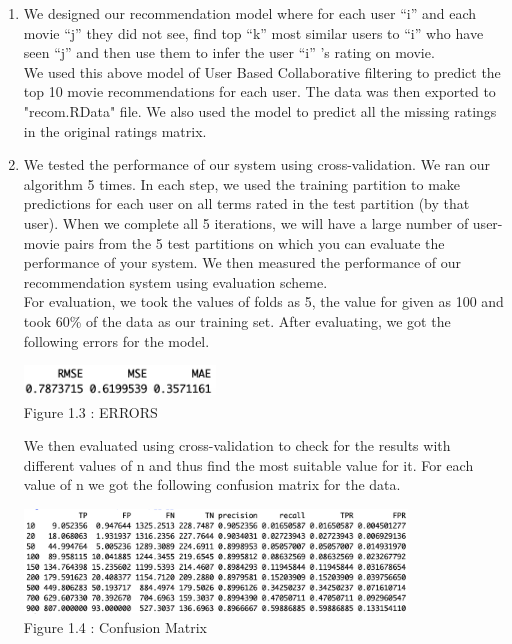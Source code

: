 \documentclass[11pt]{article}
\begin{document}
\begin{enumerate}
\begin{enumerate}
    \item We designed our recommendation model where for each user “i” and each movie “j” they did not see, find top “k” most similar users to “i” who have seen “j” and then use them to infer the user “i” ’s rating on movie.
    \\We used this above model of User Based Collaborative filtering to predict the top 10 movie recommendations for each user. The data was then exported to "recom.RData" file. We also used the model to predict all the missing ratings in the original ratings matrix.
    \item We tested the performance of our system using cross-validation. We ran our algorithm 5 times. In each step, we used the training partition to make predictions for each user on all terms rated in the test partition (by that user). When we complete all 5 iterations, we will have a large number of user-movie pairs from the 5 test partitions on which you can evaluate the performance of your system. We then measured the performance of our recommendation system using evaluation scheme.
    \\For evaluation, we took the values of folds as 5, the value for given as 100 and took 60\% of the data as our training set. After evaluating, we got the following errors for the model.
    \begin{center}
    \includegraphics[width=0.4\textwidth]{dff.png}
    \\\footnotesize Figure 1.3 : ERRORS 
\end{center}
We then evaluated using cross-validation to check for the results with different values of n and thus find the most suitable value for it. For each value of n we got the following confusion matrix for the data.
\begin{center}
    \includegraphics[width=0.8\textwidth]{tyui.png}
    \\\footnotesize Figure 1.4 : Confusion Matrix
\end{center}


\end{enumerate}
\end{enumerate}
\end{document}
